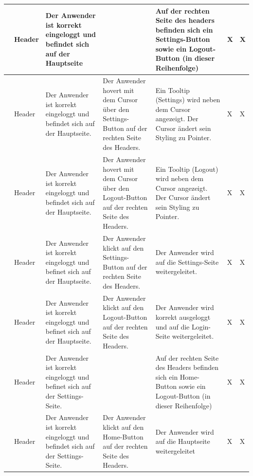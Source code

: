 \begin{longtable}{| p{} | p{} | p{} | p{} | p{} | p{} | p{} |}
	\stepcounter{TestNumber}\arabic{TestNumber} & Header & Der Anwender ist korrekt eingeloggt und befindet sich auf der Hauptseite & & Auf der rechten Seite des headers befinden sich ein Settings-Button sowie ein Logout-Button (in dieser Reihenfolge) & X & X \\ \hline
	
	\stepcounter{TestNumber}\arabic{TestNumber} & Header & Der Anwender ist korrekt eingeloggt und befindet sich auf der Hauptseite. & Der Anwender hovert mit dem Cursor über den Settings-Button auf der rechten Seite des Headers. & Ein Tooltip (Settings) wird neben dem Cursor angezeigt. Der Cursor ändert sein Styling zu Pointer. & X & X \\ \hline
	
	\stepcounter{TestNumber}\arabic{TestNumber} & Header & Der Anwender ist korrekt eingeloggt und befindet sich auf der Hauptseite. & Der Anwender hovert mit dem Cursor über den Logout-Button auf der rechten Seite des Headers. & Ein Tooltip (Logout) wird neben dem Cursor angezeigt. Der Cursor ändert sein Styling zu Pointer. & X & X \\ \hline
	
	\stepcounter{TestNumber}\arabic{TestNumber} & Header & Der Anwender ist korrekt eingeloggt und befinet sich auf der Hauptseite. & Der Anwender klickt auf den Settings-Button auf der rechten Seite des Headers. & Der Anwender wird auf die Settings-Seite weitergeleitet. & X & X \\ \hline

	\stepcounter{TestNumber}\arabic{TestNumber} & Header & Der Anwender ist korrekt eingeloggt und befinet sich auf der Hauptseite. & Der Anwender klickt auf den Logout-Button auf der rechten Seite des Headers. & Der Anwender wird korrekt ausgeloggt und auf die Login-Seite weitergeleitet. & X & X \\ \hline

	\stepcounter{TestNumber}\arabic{TestNumber} & Header & Der Anwender ist korrekt eingeloggt und befinet sich auf der Settings-Seite. & & Auf der rechten Seite des Headers befinden sich ein Home-Button sowie ein Logout-Button (in dieser Reihenfolge) & X & X \\ \hline
	
	\stepcounter{TestNumber}\arabic{TestNumber} & Header & Der Anwender ist korrekt eingeloggt und befindet sich auf der Settings-Seite. & Der Anwender klickt auf den Home-Button auf der rechten Seite des Headers. & Der Anwender wird auf die Hauptseite weitergeleitet & X & X \\ \hline
	

\end{longtable}
